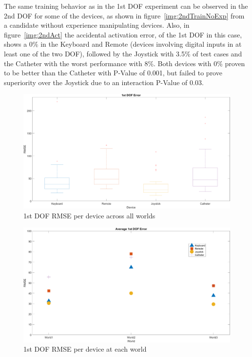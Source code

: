 The same training behavior as in the 1st DOF experiment can be observed in the 2nd DOF for some of the devices, as shown in figure~\ref{img:2ndTrainNoExp} from a candidate without experience manipulating devices. Also, in figure~\ref{img:2ndAct} the accidental activation error, of the 1st DOF in this case, shows a 0\% in the Keyboard and Remote (devices involving digital inputs in at least one of the two DOF), followed by the Joystick with 3.5\% of test cases and the Catheter with the worst performance with 8\%. Both devices with 0\% proven to be better than the Catheter with P-Value of 0.001, but failed to prove superiority over the Joystick due to an interaction P-Value of 0.03.\\

\begin{figure}[ht]
   \centering
   \includegraphics[width=1.0\textwidth]{img/1st/1stError.png}
   \caption{1st DOF RMSE per device across all worlds}
   \label{img:1stError}
\end{figure}

\begin{figure}[ht]
   \centering
   \includegraphics[width=1.0\textwidth]{img/1st/1stAvgError.png}
   \caption{1st DOF RMSE per device at each world}
   \label{img:1stAvgError}
\end{figure}

